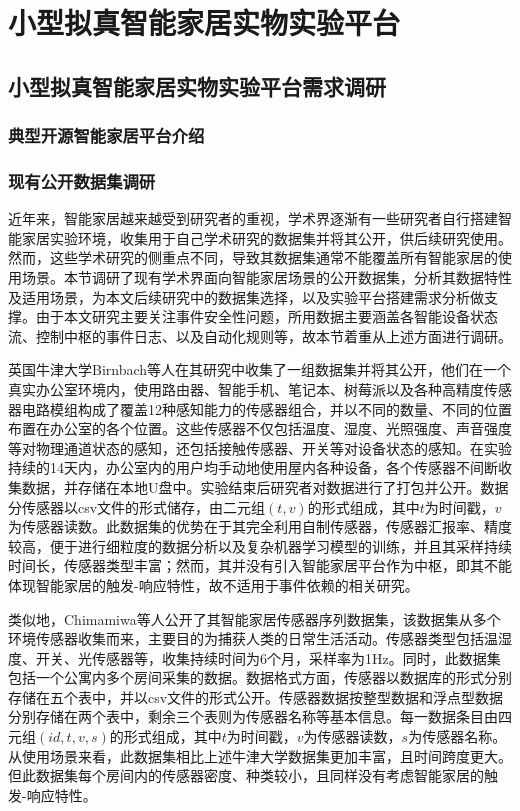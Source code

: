 \chapter{小型拟真智能家居实物实验平台}

\section{小型拟真智能家居实物实验平台需求调研}

\subsection{典型开源智能家居平台介绍}

\subsection{现有公开数据集调研}

近年来，智能家居越来越受到研究者的重视，学术界逐渐有一些研究者自行搭建智能家居实验环境，收集用于自己学术研究的数据集并将其公开，供后续研究使用。然而，这些学术研究的侧重点不同，导致其数据集通常不能覆盖所有智能家居的使用场景。本节调研了现有学术界面向智能家居场景的公开数据集，分析其数据特性及适用场景，为本文后续研究中的数据集选择，以及实验平台搭建需求分析做支撑。由于本文研究主要关注事件安全性问题，所用数据主要涵盖各智能设备状态流、控制中枢的事件日志、以及自动化规则等，故本节着重从上述方面进行调研。

英国牛津大学Birnbach等人在其研究中收集了一组数据集并将其公开，他们在一个真实办公室环境内，使用路由器、智能手机、笔记本、树莓派以及各种高精度传感器电路模组构成了覆盖12种感知能力的传感器组合，并以不同的数量、不同的位置布置在办公室的各个位置。这些传感器不仅包括温度、湿度、光照强度、声音强度等对物理通道状态的感知，还包括接触传感器、开关等对设备状态的感知。在实验持续的14天内，办公室内的用户均手动地使用屋内各种设备，各个传感器不间断收集数据，并存储在本地U盘中。实验结束后研究者对数据进行了打包并公开。数据分传感器以csv文件的形式储存，由二元组$(t,v)$的形式组成，其中$t$为时间戳，$v$为传感器读数。此数据集的优势在于其完全利用自制传感器，传感器汇报率、精度较高，便于进行细粒度的数据分析以及复杂机器学习模型的训练，并且其采样持续时间长，传感器类型丰富；然而，其并没有引入智能家居平台作为中枢，即其不能体现智能家居的触发-响应特性，故不适用于事件依赖的相关研究。

类似地，Chimamiwa等人公开了其智能家居传感器序列数据集，该数据集从多个环境传感器收集而来，主要目的为捕获人类的日常生活活动。传感器类型包括温湿度、开关、光传感器等，收集持续时间为6个月，采样率为1Hz。同时，此数据集包括一个公寓内多个房间采集的数据。数据格式方面，传感器以数据库的形式分别存储在五个表中，并以csv文件的形式公开。传感器数据按整型数据和浮点型数据分别存储在两个表中，剩余三个表则为传感器名称等基本信息。每一数据条目由四元组$(id,t,v,s)$的形式组成，其中$t$为时间戳，$v$为传感器读数，$s$为传感器名称。从使用场景来看，此数据集相比上述牛津大学数据集更加丰富，且时间跨度更大。但此数据集每个房间内的传感器密度、种类较小，且同样没有考虑智能家居的触发-响应特性。

